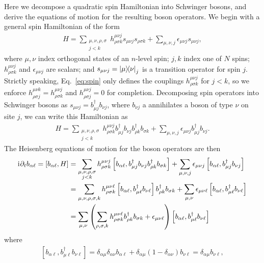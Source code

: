 \documentclass[nofootinbib,twocolumn]{revtex4-2}
\newcommand{\p}[1]{\left(#1\right)} %
\renewcommand{\sp}[1]{\left[#1\right]} %
\renewcommand{\d}{\partial} %
\renewcommand{\i}{\mathrm{i}\mkern1mu} %
\newcommand{\1}{\mathds{1}}
\begin{document}
Here we decompose a quadratic spin Hamiltonian into Schwinger bosons, and derive the equations of motion for the resulting boson operators.
We begin with a general spin Hamiltonian of the form
\begin{align}
  H = \sum_{\substack{\mu,\nu,\rho,\sigma\\j<k}}
  h^{\mu\nu j}_{\rho\sigma k} s_{\mu\nu j} s_{\rho\sigma k}
  + \sum_{\mu,\nu,j} \epsilon_{\mu\nu j} s_{\mu\nu j},
  \label{eq:spin}
\end{align}
where $\mu,\nu$ index orthogonal states of an $n$-level spin; $j,k$ index one of $N$ spins; $h^{\mu\nu j}_{\rho\sigma k}$ and $\epsilon_{\mu\nu j}$ are scalars; and $s_{\mu\nu j}=\op{\mu}{\nu}_j$ is a transition operator for spin $j$.
Strictly speaking, Eq.~\eqref{eq:spin} only defines the couplings $h^{\mu\nu j}_{\rho\sigma k}$ for $j<k$, so we enforce $h^{\mu\nu k}_{\rho\sigma j}=h^{\mu\nu j}_{\rho\sigma k}$ and $h^{\mu\nu j}_{\rho\sigma j}=0$ for completion.
Decomposing spin operators into Schwinger bosons as $s_{\mu\nu j}=b_{\mu j}^\dag b_{\nu j}$, where $b_{\nu j}$ a annihilates a boson of type $\nu$ on site $j$, we can write this Hamiltonian as
\begin{align}
  H = \sum_{\substack{\mu,\nu,\rho,\sigma\\j<k}}
  h^{\mu\nu j}_{\rho\sigma k}
  b_{\mu j}^\dag b_{\nu j} b_{\rho k}^\dag b_{\sigma k}
  + \sum_{\mu,\nu,j} \epsilon_{\mu\nu j} b_{\mu j}^\dag b_{\nu j}.
\end{align}
The Heisenberg equations of motion for the boson operators are then
\begin{align}
  \i \d_t b_{\alpha\ell} = \sp{b_{\alpha\ell}, H}
  &= \sum_{\substack{\mu,\nu,\rho,\sigma\\j<k}}
  h^{\mu\nu j}_{\rho\sigma k}
  \sp{b_{\alpha\ell}, b_{\mu j}^\dag b_{\nu j} b_{\rho k}^\dag b_{\sigma k}}
  + \sum_{\mu,\nu,j} \epsilon_{\mu\nu j}
  \sp{b_{\alpha\ell}, b_{\mu j}^\dag b_{\nu j}} \\
  &= \sum_{\mu,\nu,\rho,\sigma,k} h^{\mu\nu\ell}_{\rho\sigma k}
  \sp{b_{\alpha\ell}, b_{\mu\ell}^\dag b_{\nu\ell}}
  b_{\rho k}^\dag b_{\sigma k}
  + \sum_{\mu,\nu} \epsilon_{\mu\nu\ell}
  \sp{b_{\alpha\ell}, b_{\mu\ell}^\dag b_{\nu\ell}} \\
  &= \sum_{\mu,\nu} \p{\sum_{\rho,\sigma,k}
    h^{\mu\nu\ell}_{\rho\sigma k} b_{\rho k}^\dag b_{\sigma k}
    + \epsilon_{\mu\nu\ell}}
  \sp{b_{\alpha\ell}, b_{\mu\ell}^\dag b_{\nu\ell}}
\end{align}
where
\begin{align}
  \sp{b_{\alpha\ell}, b_{\mu\ell}^\dag b_{\nu\ell}}
  = \delta_{\alpha\mu} \delta_{\alpha\nu} b_{\alpha\ell}
  + \delta_{\alpha\mu} \p{1-\delta_{\alpha\nu}} b_{\nu\ell}
  = \delta_{\alpha\mu} b_{\nu\ell},
\end{align}
\end{document}
